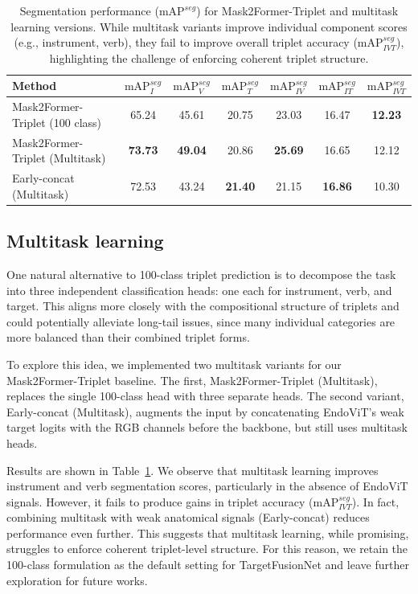 \documentclass[11pt]{article}
\newcommand{\mAP}{\textrm{mAP}}
\begin{document}
\begin{table}[t!]
\centering
\caption{Segmentation performance ($\mAP^{seg}$) for Mask2Former-Triplet and multitask learning versions. While multitask variants improve individual component scores (e.g., instrument, verb), they fail to improve overall triplet accuracy ($\mAP_{IVT}^{seg}$), highlighting the challenge of enforcing coherent triplet structure.}
\label{tab:segmentation_results}
\begin{tabular}{l|c|c|c|c|c|c}
\hline
\textbf{Method} & $\mAP_{I}^{seg}$ & $\mAP_{V}^{seg}$ & $\mAP_{T}^{seg}$ & $\mAP_{IV}^{seg}$ & $\mAP_{IT}^{seg}$ & $\mAP_{IVT}^{seg}$ \\
\hline
Mask2Former-Triplet (100 class) & 65.24 & 45.61 & 20.75 & 23.03 & 16.47 & \textbf{12.23 }\\
Mask2Former-Triplet (Multitask) & \textbf{73.73} & \textbf{49.04} & 20.86 & \textbf{25.69} & 16.65 & 12.12 \\
Early-concat (Multitask)        & 72.53 & 43.24 & \textbf{21.40} & 21.15 & \textbf{16.86} & 10.30 \\
\hline
\end{tabular}
\end{table}


\subsection {Multitask learning}
One natural alternative to 100-class triplet prediction is to decompose the task into three independent classification heads: one each for instrument, verb, and target. This aligns more closely with the compositional structure of triplets and could potentially alleviate long-tail issues, since many individual categories are more balanced than their combined triplet forms.

To explore this idea, we implemented two multitask variants for our Mask2Former-Triplet baseline. The first, Mask2Former-Triplet (Multitask), replaces the single 100-class head with three separate heads. The second variant, Early-concat (Multitask), augments the input by concatenating EndoViT's weak target logits with the RGB channels before the backbone, but still uses multitask heads.

Results are shown in Table~\ref{tab:segmentation_results}. We observe that multitask learning improves instrument and verb segmentation scores, particularly in the absence of EndoViT signals. However, it fails to produce gains in triplet accuracy (\mAP$_{IVT}^{seg}$). In fact, combining multitask with weak anatomical signals (Early-concat) reduces performance even further. This suggests that multitask learning, while promising, struggles to enforce coherent triplet-level structure. For this reason, we retain the 100-class formulation as the default setting for TargetFusionNet and leave further exploration for future works.
\end{document}
